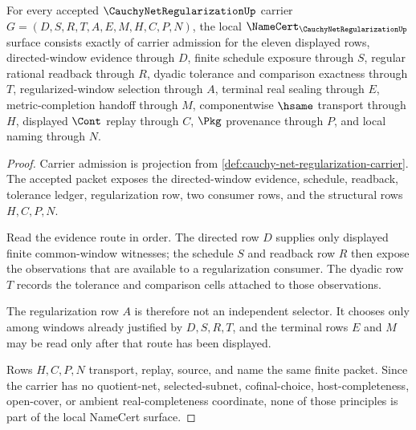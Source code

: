 \begin{theorem}
\label{thm:cauchy-net-regularization-namecert-obligations}
For every accepted $\CauchyNetRegularizationUp$ carrier $G=(D,S,R,T,A,E,M,H,C,P,N)$, the local $\NameCert_{\CauchyNetRegularizationUp}$ surface consists exactly of carrier admission for the eleven displayed rows, directed-window evidence through $D$, finite schedule exposure through $S$, regular rational readback through $R$, dyadic tolerance and comparison exactness through $T$, regularized-window selection through $A$, terminal real sealing through $E$, metric-completion handoff through $M$, componentwise $\hsame$ transport through $H$, displayed $\Cont$ replay through $C$, $\Pkg$ provenance through $P$, and local naming through $N$.
\end{theorem}
\begin{proof}
Carrier admission is projection from \autoref{def:cauchy-net-regularization-carrier}. The accepted packet exposes the directed-window evidence, schedule, readback, tolerance ledger, regularization row, two consumer rows, and the structural rows $H,C,P,N$.

Read the evidence route in order. The directed row $D$ supplies only displayed finite common-window witnesses; the schedule $S$ and readback row $R$ then expose the observations that are available to a regularization consumer. The dyadic row $T$ records the tolerance and comparison cells attached to those observations.

The regularization row $A$ is therefore not an independent selector. It chooses only among windows already justified by $D,S,R,T$, and the terminal rows $E$ and $M$ may be read only after that route has been displayed.

Rows $H,C,P,N$ transport, replay, source, and name the same finite packet. Since the carrier has no quotient-net, selected-subnet, cofinal-choice, host-completeness, open-cover, or ambient real-completeness coordinate, none of those principles is part of the local NameCert surface.
\end{proof}

